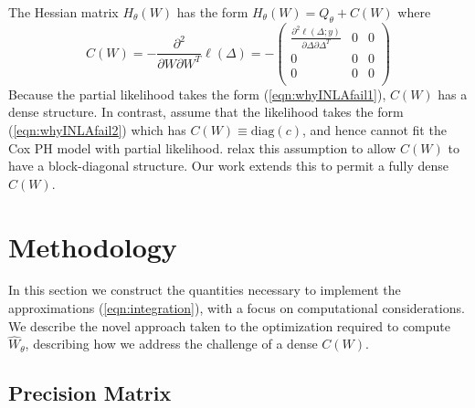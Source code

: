 \documentclass[]{article}
\begin{document}
The Hessian matrix $H_{\theta}(W)$ has the form $H_{\theta}(W) = Q_{\theta} + C(W)$ where
\begin{equation*}
C(W) = -\frac{\partial^{2}}{\partial W\partial W^{T}}\ell(\Delta) = -\begin{pmatrix}
\frac{\partial^{2}\ell(\Delta;y)}{\partial\Delta\partial\Delta^{T}} & 0 & 0 \\
0 & 0 & 0 \\
0 & 0 & 0 \\
\end{pmatrix}
\end{equation*}
Because the partial likelihood takes the form (\ref{eqn:whyINLAfail1}), $C(W)$ has a dense structure. In contrast, \citet{inla} assume that the likelihood takes the form (\ref{eqn:whyINLAfail2}) which has $C(W) \equiv \text{diag}(c)$, and hence cannot fit the Cox PH model with partial likelihood. \citet{casecross} relax this assumption to allow $C(W)$ to have a block-diagonal structure. Our work extends this to permit a fully dense $C(W)$. 

\section{Methodology}\label{sec:method}

In this section we construct the quantities necessary to implement the approximations (\ref{eqn:integration}), with a focus on computational considerations. We describe the novel approach taken to the optimization required to compute $\widehat{W}_{\theta}$, describing how we address the challenge of a dense $C(W)$.

\subsection{Precision Matrix}\label{subsec:Q} 
\end{document}
